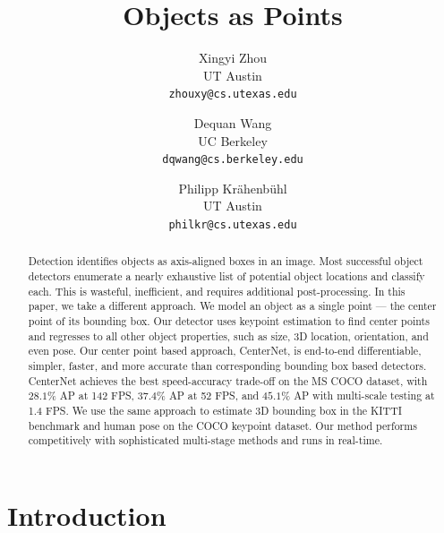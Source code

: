 \documentclass[10pt,twocolumn,letterpaper]{article}
\begin{document}
\title{Objects as Points}

\author{Xingyi Zhou\\
UT Austin\\
{\tt\small zhouxy@cs.utexas.edu}
\and
Dequan Wang\\
UC Berkeley\\
{\tt\small dqwang@cs.berkeley.edu}
\and
Philipp Kr\"ahenb\"uhl\\
UT Austin\\
{\tt\small philkr@cs.utexas.edu}
}

\maketitle


\begin{abstract}
Detection identifies objects as axis-aligned boxes in an image.
Most successful object detectors enumerate a nearly exhaustive list of potential object locations and classify each.
This is wasteful, inefficient, and requires additional post-processing.
In this paper, we take a different approach.
We model an object as a single point --- the center point of its bounding box.
Our detector uses keypoint estimation to find center points and regresses to all other object properties, such as size, 3D location, orientation, and even pose.
Our center point based approach, CenterNet, is end-to-end differentiable, simpler, faster, and more accurate than corresponding bounding box based detectors.
CenterNet achieves the best speed-accuracy trade-off on the MS COCO dataset, with $28.1\%$ AP at 142 FPS, $37.4\%$ AP at 52 FPS, and $45.1\%$ AP with multi-scale testing at 1.4 FPS.
We use the same approach to estimate 3D bounding box in the KITTI benchmark and human pose on the COCO keypoint dataset.
Our method performs competitively with sophisticated multi-stage methods and runs in real-time.

\end{abstract}

\section{Introduction}
\end{document}
